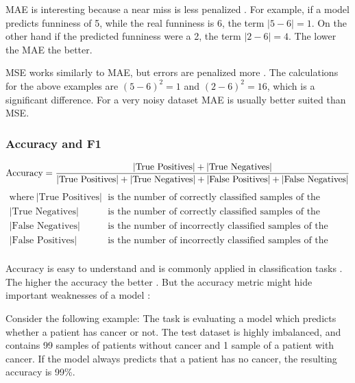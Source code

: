 \documentclass[draft,final,oneside]{vutinfth} %
\begin{document}
MAE is interesting because a near miss is less penalized \cite{accuracy}. For example, if a model predicts funniness of 5, while the real funniness is 6, the term $\mid 5 - 6 \mid = 1$. On the other hand if the predicted funniness were a 2, the term $\mid 2 - 6 \mid = 4$. The lower the MAE the better.

MSE works similarly to MAE, but errors are penalized more \cite{accuracy}. The calculations for the above examples are $\left( 5 - 6 \right)^2 = 1$ and $\left( 2 - 6 \right)^2 = 16$, which is a significant difference. For a very noisy dataset MAE is usually better suited than MSE.

\subsubsection{Accuracy and F1}

\begin{equation}
\text{Accuracy}=\frac{|\text{True Positives}| + |\text{True Negatives}|} {|\text{True Positives}| + |\text{True Negatives}| + |\text{False Positives}| + |\text{False Negatives}|}\\
\end{equation}
\begin{align*}
\text{where}~|\text{True Positives}|&~\text{is the number of correctly classified samples of the positive class} \\
|\text{True Negatives}|&~\text{is the number of correctly classified samples of the negative class} \\
|\text{False Negatives}|&~\text{is the number of incorrectly classified samples of the negative class} \\
|\text{False Positives}|&~\text{is the number of incorrectly classified samples of the positive class} \\
\end{align*}

Accuracy is easy to understand and is commonly applied in classification tasks \cite{accuracy}. The higher the accuracy the better \cite{Powers2008EvaluationFP}. But the accuracy metric might hide important weaknesses of a model \cite{accuracy}:

Consider the following example: The task is evaluating a model which predicts whether a patient has cancer or not. The test dataset is highly imbalanced, and contains 99 samples of patients without cancer and 1 sample of a patient with cancer. If the model always predicts that a patient has no cancer, the resulting accuracy is 99\%. 
\end{document}
